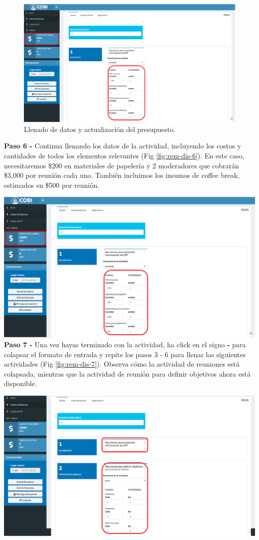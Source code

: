 \documentclass[
]{book}
\begin{document}
\begin{figure}
\centering
\includegraphics{images/rema_dis_5.png}
\caption{\label{fig:rem-dis-5}Llenado de datos y actualización del presupuesto.}
\end{figure}

\textbf{Paso 6 - } Continua llenando los datos de la actividad, incluyendo los costos y cantidades de todos los elementos relevantes (Fig \ref{fig:rem-dis-6}). En este caso, necesitaremos \$200 en materiales de papelería y 2 moderadores que cobrarán \$3,000 por reunión cada uno. También incluimos los insumos de coffee break, estimados en \$500 por reunión.

\includegraphics{images/rema_dis_6.png}
\textbf{Paso 7 - } Una vez hayas terminado con la actividad, ha click en el signo \textbf{-} para colapsar el formato de entrada y repite los pasos 3 - 6 para llenar las siguientes actividades (Fig \ref{fig:rem-dis-7}). Observa cómo la actividad de reuniones está colapsada, mientras que la actividad de reunión para definir objetivos ahora está disponible.

\includegraphics{images/rema_dis_7.png}
\end{document}
